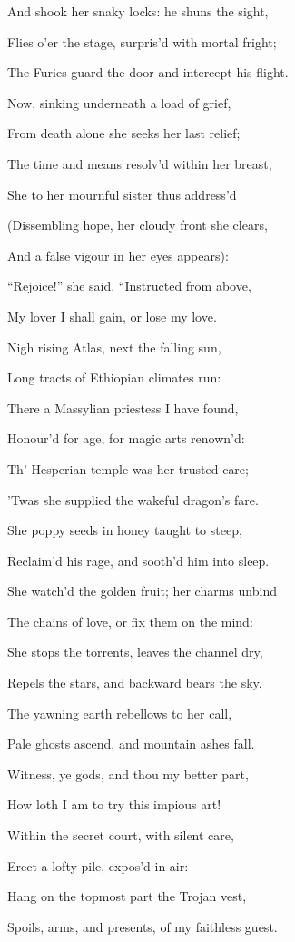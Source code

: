 And shook her snaky locks: he shuns the sight,

Flies o’er the stage, surpris’d with mortal fright;

The Furies guard the door and intercept his flight.

Now, sinking underneath a load of grief,

From death alone she seeks her last relief;

The time and means resolv’d within her breast,

She to her mournful sister thus address’d

(Dissembling hope, her cloudy front she clears,

And a false vigour in her eyes appears):

“Rejoice!” she said. “Instructed from above,

My lover I shall gain, or lose my love.

Nigh rising Atlas, next the falling sun,

Long tracts of Ethiopian climates run:

There a Massylian priestess I have found,

Honour’d for age, for magic arts renown’d:

Th’ Hesperian temple was her trusted care;

’Twas she supplied the wakeful dragon’s fare.

She poppy seeds in honey taught to steep,

Reclaim’d his rage, and sooth’d him into sleep.

She watch’d the golden fruit; her charms unbind

The chains of love, or fix them on the mind:

She stops the torrents, leaves the channel dry,

Repels the stars, and backward bears the sky.

The yawning earth rebellows to her call,

Pale ghosts ascend, and mountain ashes fall.

Witness, ye gods, and thou my better part,

How loth I am to try this impious art!

Within the secret court, with silent care,

Erect a lofty pile, expos’d in air:

Hang on the topmost part the Trojan vest,

Spoils, arms, and presents, of my faithless guest.

